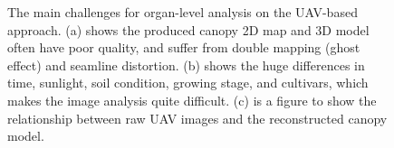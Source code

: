 \begin{figure}[htb]
  \begin{center}
  \end{center}
  \caption[Organ-level analysis challenges of UAV-based approach]{
    The main challenges for organ-level analysis on the UAV-based approach. (a) shows the produced canopy 2D map and 3D model often have poor quality, and suffer from double mapping (ghost effect) and seamline distortion. (b) shows the huge differences in time, sunlight, soil condition, growing stage, and cultivars, which makes the image analysis quite difficult. (c) is a figure to show the relationship between raw UAV images and the reconstructed canopy model.
  }
  \label{fig:idp1}
\end{figure}